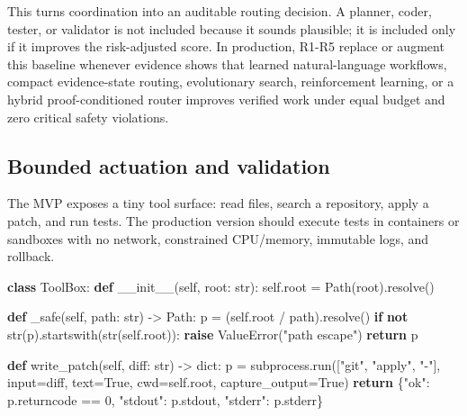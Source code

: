 \documentclass[
  11pt,
]{article}
\newenvironment{Shaded}{}{}
\newcommand{\BuiltInTok}[1]{\textcolor[rgb]{0.00,0.50,0.00}{#1}}
\newcommand{\ControlFlowTok}[1]{\textcolor[rgb]{0.00,0.44,0.13}{\textbf{#1}}}
\newcommand{\DecValTok}[1]{\textcolor[rgb]{0.25,0.63,0.44}{#1}}
\newcommand{\FunctionTok}[1]{\textcolor[rgb]{0.02,0.16,0.49}{#1}}
\newcommand{\KeywordTok}[1]{\textcolor[rgb]{0.00,0.44,0.13}{\textbf{#1}}}
\newcommand{\NormalTok}[1]{#1}
\newcommand{\OperatorTok}[1]{\textcolor[rgb]{0.40,0.40,0.40}{#1}}
\newcommand{\PreprocessorTok}[1]{\textcolor[rgb]{0.74,0.48,0.00}{#1}}
\newcommand{\StringTok}[1]{\textcolor[rgb]{0.25,0.44,0.63}{#1}}
\newcommand{\VariableTok}[1]{\textcolor[rgb]{0.10,0.09,0.49}{#1}}
\begin{document}
This turns coordination into an auditable routing decision. A planner,
coder, tester, or validator is not included because it sounds plausible;
it is included only if it improves the risk-adjusted score. In
production, R1-R5 replace or augment this baseline whenever evidence
shows that learned natural-language workflows, compact evidence-state
routing, evolutionary search, reinforcement learning, or a hybrid
proof-conditioned router improves verified work under equal budget and
zero critical safety violations.

\subsection{Bounded actuation and
validation}\label{bounded-actuation-and-validation}

The MVP exposes a tiny tool surface: read files, search a repository,
apply a patch, and run tests. The production version should execute
tests in containers or sandboxes with no network, constrained
CPU/memory, immutable logs, and rollback.

\begin{Shaded}
\begin{Highlighting}[]
\KeywordTok{class}\NormalTok{ ToolBox:}
    \KeywordTok{def} \FunctionTok{\_\_init\_\_}\NormalTok{(}\VariableTok{self}\NormalTok{, root: }\BuiltInTok{str}\NormalTok{):}
        \VariableTok{self}\NormalTok{.root }\OperatorTok{=}\NormalTok{ Path(root).resolve()}

    \KeywordTok{def}\NormalTok{ \_safe(}\VariableTok{self}\NormalTok{, path: }\BuiltInTok{str}\NormalTok{) }\OperatorTok{{-}\textgreater{}}\NormalTok{ Path:}
\NormalTok{        p }\OperatorTok{=}\NormalTok{ (}\VariableTok{self}\NormalTok{.root }\OperatorTok{/}\NormalTok{ path).resolve()}
        \ControlFlowTok{if} \KeywordTok{not} \BuiltInTok{str}\NormalTok{(p).startswith(}\BuiltInTok{str}\NormalTok{(}\VariableTok{self}\NormalTok{.root)):}
            \ControlFlowTok{raise} \PreprocessorTok{ValueError}\NormalTok{(}\StringTok{"path escape"}\NormalTok{)}
        \ControlFlowTok{return}\NormalTok{ p}

    \KeywordTok{def}\NormalTok{ write\_patch(}\VariableTok{self}\NormalTok{, diff: }\BuiltInTok{str}\NormalTok{) }\OperatorTok{{-}\textgreater{}} \BuiltInTok{dict}\NormalTok{:}
\NormalTok{        p }\OperatorTok{=}\NormalTok{ subprocess.run([}\StringTok{"git"}\NormalTok{, }\StringTok{"apply"}\NormalTok{, }\StringTok{"{-}"}\NormalTok{], }\BuiltInTok{input}\OperatorTok{=}\NormalTok{diff, text}\OperatorTok{=}\VariableTok{True}\NormalTok{,}
\NormalTok{                           cwd}\OperatorTok{=}\VariableTok{self}\NormalTok{.root, capture\_output}\OperatorTok{=}\VariableTok{True}\NormalTok{)}
        \ControlFlowTok{return}\NormalTok{ \{}\StringTok{"ok"}\NormalTok{: p.returncode }\OperatorTok{==} \DecValTok{0}\NormalTok{, }\StringTok{"stdout"}\NormalTok{: p.stdout, }\StringTok{"stderr"}\NormalTok{: p.stderr\}}
\end{Highlighting}
\end{Shaded}
\end{document}
